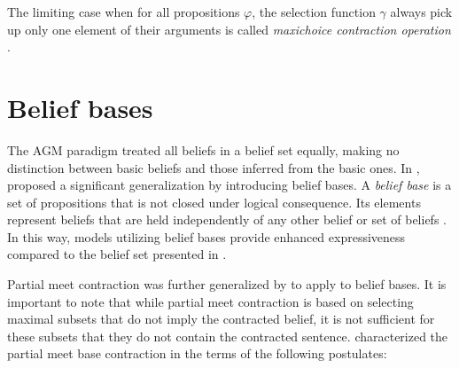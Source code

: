 \begin{definition}
    The limiting case when for all propositions $\varphi$, the selection function $\gamma$ always pick up only one element of their arguments is called \textit{maxichoice contraction operation} \citep{AGM1985}.
\end{definition}

\section{Belief bases}
\label{sec:belief-bases}

The AGM paradigm treated all beliefs in a belief set equally, making no distinction between basic beliefs and those inferred from the basic ones. In \citet{Hansson1993b}, \citeauthor{Hansson1993b} proposed a significant generalization by introducing belief bases. A \textit{belief base} is a set of propositions that is not closed under logical consequence. Its elements represent beliefs that are held independently of any other belief or set of beliefs \citep{Hansson2022}. In this way, models utilizing belief bases provide enhanced expressiveness compared to the belief set presented in \citet{AGM1985}.

Partial meet contraction was further generalized by \citeauthor{Hansson1993b} to apply to belief bases. It is important to note that while partial meet contraction is based on selecting maximal subsets that do not imply the contracted belief, it is not sufficient for these subsets that they do not contain the contracted sentence. \citeauthor{Hansson1993b} characterized the partial meet base contraction in the terms of the following postulates:

